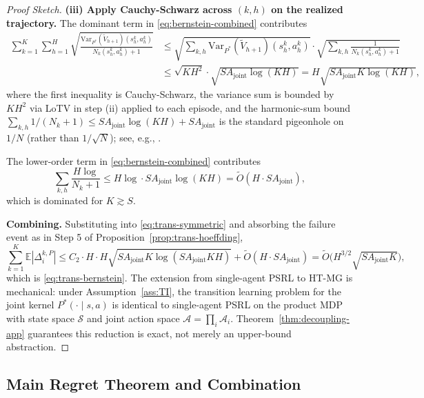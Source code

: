 \begin{proof}[Proof Sketch]
\textbf{(iii) Apply Cauchy-Schwarz across $(k, h)$ on the realized trajectory.} The dominant term in \eqref{eq:bernstein-combined} contributes
\begin{align}
\sum_{k=1}^K \sum_{h=1}^H \sqrt{\frac{\mathrm{Var}_{P^*}(\widetilde{V}_{h+1})(s_h^k, a_h^k)}{N_k(s_h^k, a_h^k) + 1}} &\leq \sqrt{\sum_{k,h} \mathrm{Var}_{P^*}(\widetilde{V}_{h+1})(s_h^k, a_h^k)} \cdot \sqrt{\sum_{k,h} \frac{1}{N_k(s_h^k, a_h^k) + 1}} \\
&\leq \sqrt{KH^2} \cdot \sqrt{SA_{\mathrm{joint}} \log(KH)} = H\sqrt{SA_{\mathrm{joint}} K \log(KH)},
\end{align}
where the first inequality is Cauchy-Schwarz, the variance sum is bounded by $KH^2$ via LoTV in step (ii) applied to each episode, and the harmonic-sum bound $\sum_{k,h} 1/(N_k+1) \leq SA_{\mathrm{joint}} \log(KH) + SA_{\mathrm{joint}}$ is the standard pigeonhole on $1/N$ (rather than $1/\sqrt{N}$); see, e.g., \citet[Section 3.3]{lattimore2020bandit}.

The lower-order term in \eqref{eq:bernstein-combined} contributes
\begin{equation}
\sum_{k,h} \frac{H \log}{N_k + 1} \leq H \log \cdot SA_{\mathrm{joint}} \log(KH) = \tilde{O}(H \cdot SA_{\mathrm{joint}}),
\end{equation}
which is dominated for $K \gtrsim S$.

\textbf{Combining.} Substituting into \eqref{eq:trans-symmetric} and absorbing the failure event as in Step 5 of Proposition~\ref{prop:trans-hoeffding},
\begin{equation}
\sum_{k=1}^K \mathbb{E}|\Delta_i^{k,P}| \leq C_2 \cdot H \cdot H\sqrt{SA_{\mathrm{joint}} K \log(SA_{\mathrm{joint}}KH)} + \tilde{O}(H \cdot SA_{\mathrm{joint}}) = \tilde{O}\big(H^{3/2}\sqrt{SA_{\mathrm{joint}} K}\big),
\end{equation}
which is \eqref{eq:trans-bernstein}. The extension from single-agent PSRL to HT-MG is mechanical: under Assumption~\ref{ass:TI}, the transition learning problem for the joint kernel $P^*(\cdot \mid s, a)$ is identical to single-agent PSRL on the product MDP with state space $\mathcal{S}$ and joint action space $\mathcal{A} = \prod_i \mathcal{A}_i$. Theorem~\ref{thm:decoupling-app} guarantees this reduction is exact, not merely an upper-bound abstraction.
\end{proof}

\subsection{Main Regret Theorem and Combination}

